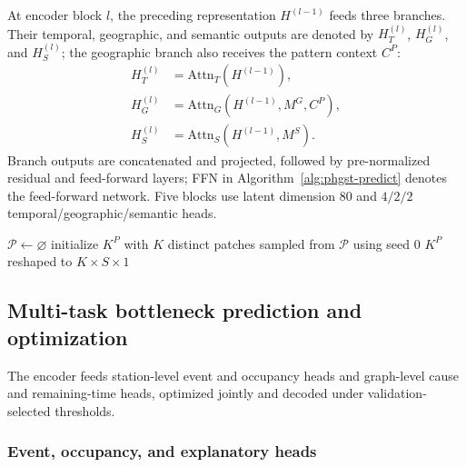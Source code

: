 \documentclass[a4paper,fleqn]{cas-dc}
\begin{document}
At encoder block $l$, the preceding representation $H^{(l-1)}$ feeds three branches. Their temporal, geographic, and semantic outputs are denoted by $H_T^{(l)}$, $H_G^{(l)}$, and $H_S^{(l)}$; the geographic branch also receives the pattern context $C^P$:
\begin{equation}
\begin{aligned}
H_T^{(l)}&=\mathrm{Attn}_T(H^{(l-1)}),\\
H_G^{(l)}&=\mathrm{Attn}_G(H^{(l-1)},M^G,C^P),\\
H_S^{(l)}&=\mathrm{Attn}_S(H^{(l-1)},M^S).
\end{aligned}
\end{equation}
Branch outputs are concatenated and projected, followed by pre-normalized residual and feed-forward layers; FFN in Algorithm~\ref{alg:phgst-predict} denotes the feed-forward network. Five blocks use latent dimension 80 and $4/2/2$ temporal/geographic/semantic heads.

\begin{algorithm}[t]
\caption{Training-only temporal pattern clustering.}
\label{alg:pattern-bank}
$\mathcal{P}\leftarrow\varnothing$\;
initialize $K^P$ with $K$ distinct patches sampled from $\mathcal{P}$ using seed $0$\;
\Return $K^P$ reshaped to $K\times S\times1$\;
\end{algorithm}

\subsection{Multi-task bottleneck prediction and optimization}

The encoder feeds station-level event and occupancy heads and graph-level cause and remaining-time heads, optimized jointly and decoded under validation-selected thresholds.

\subsubsection{Event, occupancy, and explanatory heads}
\end{document}
